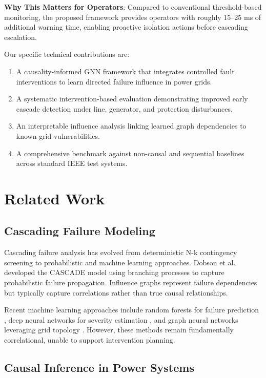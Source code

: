 \documentclass[journal,12pt,onecolumn]{IEEEtran}
\begin{document}
\textbf{Why This Matters for Operators}: Compared to conventional threshold-based monitoring, the proposed framework provides operators with roughly 15--25 ms of additional warning time, enabling proactive isolation actions before cascading escalation.

Our specific technical contributions are:
\begin{enumerate}
    \item A causality-informed GNN framework that integrates controlled fault interventions to learn directed failure influence in power grids.
    \item A systematic intervention-based evaluation demonstrating improved early cascade detection under line, generator, and protection disturbances.
    \item An interpretable influence analysis linking learned graph dependencies to known grid vulnerabilities.
    \item A comprehensive benchmark against non-causal and sequential baselines across standard IEEE test systems.
\end{enumerate}

\section{Related Work}
\label{sec:related_work}

\subsection{Cascading Failure Modeling}

Cascading failure analysis has evolved from deterministic N-k contingency screening to probabilistic and machine learning approaches. Dobson et al. \cite{ref4} developed the CASCADE model using branching processes to capture probabilistic failure propagation. Influence graphs \cite{ref5} represent failure dependencies but typically capture correlations rather than true causal relationships.

Recent machine learning approaches include random forests for failure prediction \cite{ref6}, deep neural networks for severity estimation \cite{ref7}, and graph neural networks leveraging grid topology \cite{ref8}. However, these methods remain fundamentally correlational, unable to support intervention planning.

\subsection{Causal Inference in Power Systems}
\end{document}
